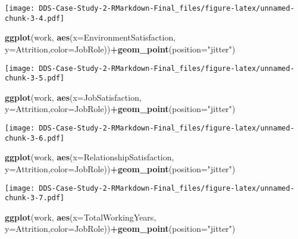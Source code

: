\documentclass[]{article}
\newenvironment{Shaded}{\begin{snugshade}}{\end{snugshade}}
\newcommand{\DataTypeTok}[1]{\textcolor[rgb]{0.13,0.29,0.53}{#1}}
\newcommand{\KeywordTok}[1]{\textcolor[rgb]{0.13,0.29,0.53}{\textbf{#1}}}
\newcommand{\NormalTok}[1]{#1}
\newcommand{\OperatorTok}[1]{\textcolor[rgb]{0.81,0.36,0.00}{\textbf{#1}}}
\newcommand{\StringTok}[1]{\textcolor[rgb]{0.31,0.60,0.02}{#1}}
\begin{document}
\texttt{[image: DDS-Case-Study-2-RMarkdown-Final\_files/figure-latex/unnamed-chunk-3-4.pdf]}

\begin{Shaded}
\begin{Highlighting}[]
\KeywordTok{ggplot}\NormalTok{(work, }\KeywordTok{aes}\NormalTok{(}\DataTypeTok{x=}\NormalTok{EnvironmentSatisfaction, }\DataTypeTok{y=}\NormalTok{Attrition,}\DataTypeTok{color=}\NormalTok{JobRole))}\OperatorTok{+}\KeywordTok{geom_point}\NormalTok{(}\DataTypeTok{position=}\StringTok{"jitter"}\NormalTok{)}
\end{Highlighting}
\end{Shaded}

\texttt{[image: DDS-Case-Study-2-RMarkdown-Final\_files/figure-latex/unnamed-chunk-3-5.pdf]}

\begin{Shaded}
\begin{Highlighting}[]
\KeywordTok{ggplot}\NormalTok{(work, }\KeywordTok{aes}\NormalTok{(}\DataTypeTok{x=}\NormalTok{JobSatisfaction, }\DataTypeTok{y=}\NormalTok{Attrition,}\DataTypeTok{color=}\NormalTok{JobRole))}\OperatorTok{+}\KeywordTok{geom_point}\NormalTok{(}\DataTypeTok{position=}\StringTok{"jitter"}\NormalTok{)}
\end{Highlighting}
\end{Shaded}

\texttt{[image: DDS-Case-Study-2-RMarkdown-Final\_files/figure-latex/unnamed-chunk-3-6.pdf]}

\begin{Shaded}
\begin{Highlighting}[]
\KeywordTok{ggplot}\NormalTok{(work, }\KeywordTok{aes}\NormalTok{(}\DataTypeTok{x=}\NormalTok{RelationshipSatisfaction, }\DataTypeTok{y=}\NormalTok{Attrition,}\DataTypeTok{color=}\NormalTok{JobRole))}\OperatorTok{+}\KeywordTok{geom_point}\NormalTok{(}\DataTypeTok{position=}\StringTok{"jitter"}\NormalTok{)}
\end{Highlighting}
\end{Shaded}

\texttt{[image: DDS-Case-Study-2-RMarkdown-Final\_files/figure-latex/unnamed-chunk-3-7.pdf]}

\begin{Shaded}
\begin{Highlighting}[]
\KeywordTok{ggplot}\NormalTok{(work, }\KeywordTok{aes}\NormalTok{(}\DataTypeTok{x=}\NormalTok{TotalWorkingYears, }\DataTypeTok{y=}\NormalTok{Attrition,}\DataTypeTok{color=}\NormalTok{JobRole))}\OperatorTok{+}\KeywordTok{geom_point}\NormalTok{(}\DataTypeTok{position=}\StringTok{"jitter"}\NormalTok{)}
\end{Highlighting}
\end{Shaded}
\end{document}
